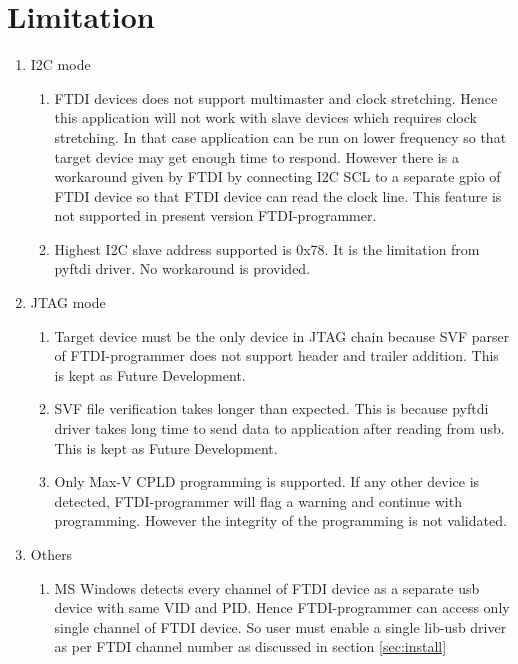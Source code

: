 \section{Limitation}\label{sec:limit}
\begin{enumerate}
	\item I2C mode
		\begin{enumerate}
			\item 
			FTDI devices does not support multimaster and clock stretching. Hence this application will not work with
			slave devices which requires clock stretching. In that case application can be run on lower frequency
			so that target device may get enough time to respond. However there is a workaround given by FTDI by 
			connecting I2C SCL to a separate gpio of FTDI device so that FTDI device can read the clock line. This 
			feature is not supported in present version FTDI-programmer.

			\item	
			Highest I2C slave address supported is 0x78. It is the limitation from pyftdi driver. No workaround is provided.
		\end{enumerate}
	
	\item	JTAG mode
		\begin{enumerate}
			\item Target device must be the only device in JTAG chain because SVF parser of FTDI-programmer does not support
			header and trailer addition. This is kept as Future Development.
			\item
			SVF file verification takes longer than expected. This is because pyftdi driver takes long time to send data to 
			application after reading from usb. This is kept as Future Development.
			\item
			Only Max-V CPLD programming is supported. If any other device is detected, FTDI-programmer will flag a warning
			and continue with programming. However the integrity of the programming is not validated.  
		\end{enumerate}

	\item	Others
		\begin{enumerate}
			\item 
			MS Windows detects every channel of FTDI device as a separate usb device with same VID and PID. Hence FTDI-programmer
			can access only single channel of FTDI device. So user must enable a single lib-usb driver as per FTDI channel number
			as discussed in section \ref{sec:install}
		\end{enumerate}
	\end{enumerate}	


